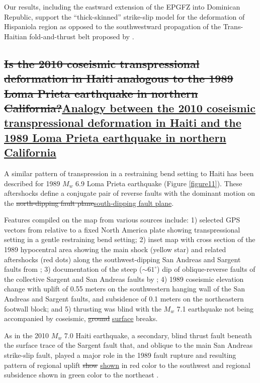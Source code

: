 \documentclass[linenumbers,draft]{agujournal}
\providecommand{\DIFdel}[1]{{\protect\color{red}\sout{#1}}}                      %
\providecommand{\DIFaddbegin}{} %
\providecommand{\DIFaddend}{} %
\providecommand{\DIFdelbegin}{} %
\providecommand{\DIFdelend}{} %
\begin{document}
Our results, including the eastward extension of the EPGFZ into Dominican Republic, support the ``thick-skinned'' strike-slip model for the deformation of Hispaniola region as opposed to the southwestward propagation of the Trans-Haitian fold-and-thrust belt proposed by \citet{pubellier2000plate}. 

\subsection{\DIFdelbegin \DIFdel{Is the 2010 coseismic transpressional deformation in Haiti analogous to the 1989 Loma Prieta earthquake in northern California?}\DIFdelend \DIFaddbegin \ul{Analogy between the 2010 coseismic transpressional deformation in Haiti and the 1989 Loma Prieta earthquake in northern California}\DIFaddend }
A similar pattern of transpression in a restraining bend setting to Haiti has been described for 1989 $M_w$ 6.9 Loma Prieta earthquake \citep{marshall1991faulting} (Figure \ref{figure11}). These aftershocks define a conjugate pair of reverse faults with the dominant motion on the \DIFdelbegin \DIFdel{north-dipping fault plane}\DIFdelend \DIFaddbegin \ul{south-dipping fault plane}\DIFaddend .

Features compiled on the map from various sources include: 1) selected GPS vectors from \citet{UNAVCO2009} relative to a fixed North America plate showing transpressional setting in a gentle restraining bend setting; 2) inset map with cross section of the 1989 hypocentral area showing the main shock (yellow star) and related aftershocks (red dots) along the southwest-dipping San Andreas and Sargent faults from \citet{marshall1991faulting}; 3) documentation of the steep ($\sim61^{\circ}$) dip of oblique-reverse faults of the collective Sargent and San Andreas faults by \citet{marshall1991faulting}; 4) 1989 coseismic elevation change with uplift of 0.55 meters on the southwestern hanging wall of the San Andreas and Sargent faults, and subsidence of 0.1 meters on the northeastern footwall block; and 5) thrusting was blind with the $M_w$ 7.1 earthquake not being accompanied by coseismic, \DIFdelbegin \DIFdel{ground }\DIFdelend \DIFaddbegin \ul{surface} \DIFaddend breaks. 

As in the 2010 $M_w$ 7.0 Haiti earthquake, a secondary, blind thrust fault beneath the surface trace of the Sargent fault that, and oblique to the main San Andreas strike-slip fault, played a major role in the 1989 fault rupture and resulting pattern of regional uplift \DIFdelbegin \DIFdel{show }\DIFdelend \DIFaddbegin \ul{shown} \DIFaddend in red color to the southwest and regional subsidence shown in green color to the northeast \citep{olson1990seismicity}.
\end{document}
